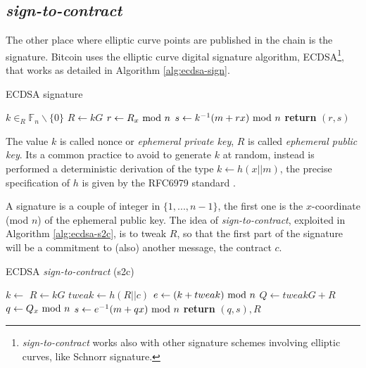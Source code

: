 \subsection{\textit{sign-to-contract}}
The other place where elliptic curve points are published in the chain is the signature. Bitcoin uses the elliptic curve digital signature algorithm, ECDSA\footnote{\textit{sign-to-contract} works also with other signature schemes involving elliptic curves, like Schnorr signature.}, that works as detailed in Algorithm \ref{alg:ecdsa-sign}.
\begin{algorithm}
	\caption{ECDSA signature}
	\label{alg:ecdsa-sign}
	\begin{algorithmic}[1]
		\Statex {}
		\State $k \in_R \mathbb{F}_n \backslash \{0\}$ 
		\State $R \gets k G$
		\State $r \gets R_x \textmd{ mod }n$
		\State $s \gets k^{-1}(m + rx) \textmd{ mod }n$
		\State \textbf{return} $(r,s)$
		\EndProcedure
	\end{algorithmic}
\end{algorithm}
The value $k$ is called nonce or \textit{ephemeral private key}, $R$ is called \textit{ephemeral public key}.
Its a common practice to avoid to generate $k$ at random,  instead is performed a deterministic derivation of the type $k \gets h(x||m)$, the precise specification of $h$ is given by the RFC6979 standard \cite{rfc6979}.

A signature is a couple of integer in $\{1,...,n-1\}$, the first one is the $x$-coordinate (mod $n$) of the ephemeral public key.
The idea of \textit{sign-to-contract}, exploited in Algorithm \ref{alg:ecdsa-s2c}, is to tweak $R$, so that the first part of the signature will be a commitment to (also) another message, the contract $c$.
\begin{algorithm}
	\caption{ECDSA \textit{sign-to-contract} (s2c)}
	\label{alg:ecdsa-s2c}
	\begin{algorithmic}[1]
		\Statex {}
		\Statex {}
		\State $k \gets$  
		\State $R \gets k G$
		\State $tweak \gets h(R||c)$
		\State $e \gets (k + tweak) \textmd{ mod }n$ 
		\State $Q \gets tweak G + R$
		\State $q \gets Q_x \textmd{ mod }n$
		\Statex {}
		\State $s \gets e^{-1}(m + qx) \textmd{ mod }n$
		\State \textbf{return} $(q,s), R$
		\EndProcedure
	\end{algorithmic}
\end{algorithm}

